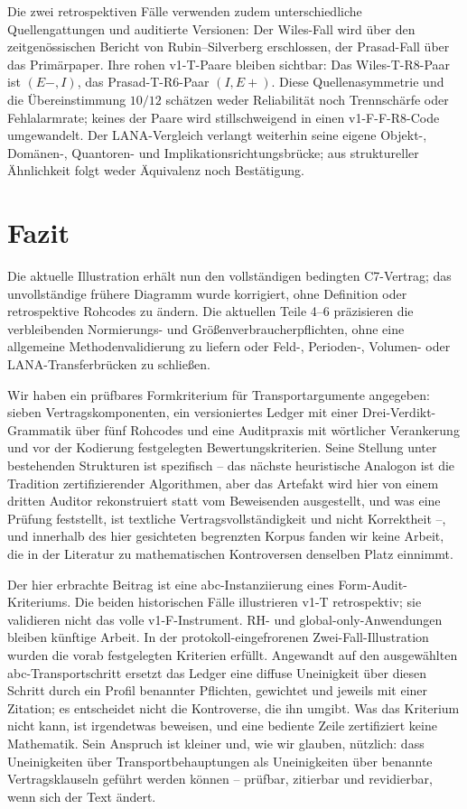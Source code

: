 \documentclass[11pt,a4paper]{article}
\begin{document}
Die zwei retrospektiven Fälle verwenden zudem unterschiedliche
Quellengattungen und auditierte Versionen: Der Wiles-Fall wird über den
zeitgenössischen Bericht von Rubin--Silverberg erschlossen, der Prasad-Fall
über das Primärpaper. Ihre rohen v1-T-Paare bleiben sichtbar: Das
Wiles-T-R8-Paar ist $(E-,I)$, das Prasad-T-R6-Paar $(I,E+)$.
Diese Quellenasymmetrie und die Übereinstimmung $10/12$ schätzen weder
Reliabilität noch Trennschärfe oder Fehlalarmrate; keines der Paare wird
stillschweigend in einen v1-F-F-R8-Code umgewandelt. Der LANA-Vergleich
verlangt weiterhin seine eigene Objekt-, Domänen-, Quantoren- und
Implikationsrichtungsbrücke; aus struktureller Ähnlichkeit folgt weder
Äquivalenz noch Bestätigung.

\section{Fazit}\label{sec:conclusion}

Die aktuelle Illustration erhält nun den vollständigen bedingten
C7-Vertrag; das unvollständige frühere Diagramm wurde korrigiert, ohne
Definition oder retrospektive Rohcodes zu ändern. Die aktuellen Teile 4--6
präzisieren die verbleibenden Normierungs- und Größenverbraucherpflichten,
ohne eine allgemeine Methodenvalidierung zu liefern oder Feld-, Perioden-,
Volumen- oder LANA-Transferbrücken zu schließen.



Wir haben ein prüfbares Formkriterium für Transportargumente angegeben:
sieben Vertragskomponenten, ein versioniertes Ledger mit einer
Drei-Verdikt-Grammatik über fünf Rohcodes und eine Auditpraxis mit wörtlicher
Verankerung und vor der Kodierung festgelegten Bewertungskriterien. Seine
Stellung unter bestehenden Strukturen ist spezifisch -- das nächste
heuristische Analogon ist die Tradition zertifizierender Algorithmen, aber
das Artefakt wird hier von einem dritten Auditor rekonstruiert statt vom
Beweisenden ausgestellt, und was eine Prüfung feststellt, ist textliche
Vertragsvollständigkeit und nicht Korrektheit --, und innerhalb des hier
gesichteten begrenzten Korpus fanden wir keine Arbeit, die in der Literatur
zu mathematischen Kontroversen denselben Platz einnimmt.

Der hier erbrachte Beitrag ist eine abc-Instanziierung eines
Form-Audit-Kriteriums. Die beiden historischen Fälle illustrieren v1-T
retrospektiv; sie validieren nicht das volle v1-F-Instrument. RH- und
global-only-Anwendungen bleiben künftige Arbeit. In der
protokoll-eingefrorenen Zwei-Fall-Illustration wurden die vorab festgelegten
Kriterien erfüllt. Angewandt auf den ausgewählten abc-Transportschritt
ersetzt das Ledger eine diffuse Uneinigkeit über diesen Schritt durch ein
Profil benannter Pflichten, gewichtet und jeweils mit einer Zitation; es
entscheidet nicht die Kontroverse, die ihn umgibt. Was das Kriterium nicht
kann, ist irgendetwas beweisen, und eine bediente Zeile zertifiziert keine
Mathematik. Sein Anspruch ist kleiner und, wie wir glauben, nützlich: dass
Uneinigkeiten über Transportbehauptungen als Uneinigkeiten über benannte
Vertragsklauseln geführt werden können -- prüfbar, zitierbar und
revidierbar, wenn sich der Text ändert.
\end{document}
